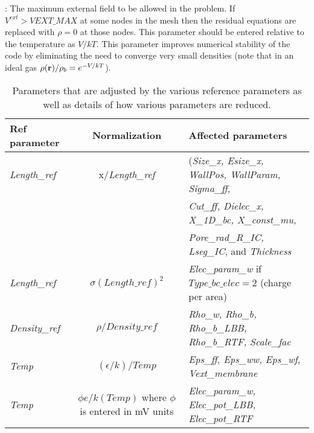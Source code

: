 \documentclass[10pt,onecolumn]{article}
\begin{document}


\vspace{0.1in}
: The maximum external field to be allowed in the
problem.  If $V^{ext} > VEXT\_MAX$ at some nodes in the mesh then the residual equations are replaced with
$\rho=0$ at those nodes.  This parameter should be entered relative to the temperature as
$V/kT$.  This parameter improves numerical stability of the code by eliminating the need to converge very small densities (note that in an ideal gas $\rho({\bf r})/\rho_b=e^{-V/kT}$).
\vfill
\break

\begin{table}[h]
\begin{tabular}{|l|c|l|}
\hline
Ref parameter &  Normalization & Affected parameters\\ \hline
{\it Length\_ref} &  x/{\it Length\_ref} & ({\it Size\_x, Esize\_x, WallPos, WallParam, Sigma\_ff,}\\
&&  {\it Cut\_ff, Dielec\_x, X\_1D\_bc, X\_const\_mu,}\\
&&  {\it  Pore\_rad\_R\_IC, Lseg\_IC}, and {\it Thickness} \\ \hline
{\it Length\_ref} & $\sigma (Length\_ref)^2$ & {\it Elec\_param\_w} if $Type\_bc\_elec=2$ (charge per area) \\ \hline
{\it Density\_ref} & $\rho/Density\_ref$ & {\it Rho\_w, Rho\_b, Rho\_b\_LBB, Rho\_b\_RTF,
Scale\_fac} \\ \hline
{\it Temp}& $(\epsilon/k)/Temp$ & {\it Eps\_ff, Eps\_ww, Eps\_wf, Vext\_membrane}  \\ \hline
{\it Temp}& $\phi e/k(Temp)$ where $\phi$ is entered in mV units &  {\it Elec\_param\_w, Elec\_pot\_LBB, Elec\_pot\_RTF  } \\ \hline
\end{tabular}
\caption{Parameters that are adjusted by the various reference parameters as well as details of how various parameters are reduced.}
\label{tab:dimensionless}
\end{table}
\end{document}
